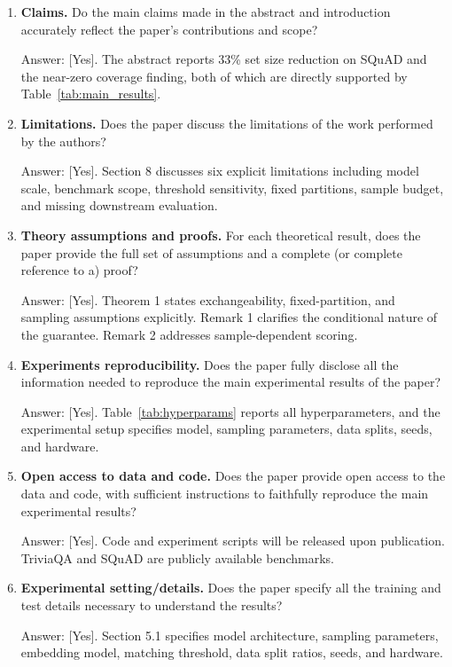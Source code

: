 \documentclass{article}
\begin{document}
\begin{enumerate}

\item \textbf{Claims.} Do the main claims made in the abstract and introduction accurately reflect the paper's contributions and scope?

Answer: [Yes]. The abstract reports 33\% set size reduction on SQuAD and the near-zero coverage finding, both of which are directly supported by Table~\ref{tab:main_results}.

\item \textbf{Limitations.} Does the paper discuss the limitations of the work performed by the authors?

Answer: [Yes]. Section 8 discusses six explicit limitations including model scale, benchmark scope, threshold sensitivity, fixed partitions, sample budget, and missing downstream evaluation.

\item \textbf{Theory assumptions and proofs.} For each theoretical result, does the paper provide the full set of assumptions and a complete (or complete reference to a) proof?

Answer: [Yes]. Theorem 1 states exchangeability, fixed-partition, and sampling assumptions explicitly. Remark 1 clarifies the conditional nature of the guarantee. Remark 2 addresses sample-dependent scoring.

\item \textbf{Experiments reproducibility.} Does the paper fully disclose all the information needed to reproduce the main experimental results of the paper?

Answer: [Yes]. Table~\ref{tab:hyperparams} reports all hyperparameters, and the experimental setup specifies model, sampling parameters, data splits, seeds, and hardware.

\item \textbf{Open access to data and code.} Does the paper provide open access to the data and code, with sufficient instructions to faithfully reproduce the main experimental results?

Answer: [Yes]. Code and experiment scripts will be released upon publication. TriviaQA and SQuAD are publicly available benchmarks.

\item \textbf{Experimental setting/details.} Does the paper specify all the training and test details necessary to understand the results?

Answer: [Yes]. Section 5.1 specifies model architecture, sampling parameters, embedding model, matching threshold, data split ratios, seeds, and hardware.


\end{enumerate}
\end{document}
